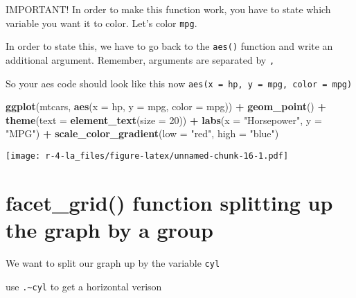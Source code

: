 \documentclass[
]{book}
\newenvironment{Shaded}{\begin{snugshade}}{\end{snugshade}}
\newcommand{\DataTypeTok}[1]{\textcolor[rgb]{0.13,0.29,0.53}{#1}}
\newcommand{\DecValTok}[1]{\textcolor[rgb]{0.00,0.00,0.81}{#1}}
\newcommand{\KeywordTok}[1]{\textcolor[rgb]{0.13,0.29,0.53}{\textbf{#1}}}
\newcommand{\NormalTok}[1]{#1}
\newcommand{\OperatorTok}[1]{\textcolor[rgb]{0.81,0.36,0.00}{\textbf{#1}}}
\newcommand{\StringTok}[1]{\textcolor[rgb]{0.31,0.60,0.02}{#1}}
\begin{document}
IMPORTANT! In order to make this function work, you have to state which variable
you want it to color. Let's color \texttt{mpg}.

In order to state this, we have to go back to the \texttt{aes()} function and write an additional argument. Remember, arguments are separated by \texttt{,}

So your aes code should look like this now \texttt{aes(x\ =\ hp,\ y\ =\ mpg,\ color\ =\ mpg)}

\begin{Shaded}
\begin{Highlighting}[]
\KeywordTok{ggplot}\NormalTok{(mtcars, }\KeywordTok{aes}\NormalTok{(}\DataTypeTok{x =}\NormalTok{ hp, }\DataTypeTok{y =}\NormalTok{ mpg, }\DataTypeTok{color =}\NormalTok{ mpg)) }\OperatorTok{+}\StringTok{ }
\StringTok{ }\KeywordTok{geom\_point}\NormalTok{() }\OperatorTok{+}\StringTok{ }
\StringTok{  }\KeywordTok{theme}\NormalTok{(}\DataTypeTok{text =} \KeywordTok{element\_text}\NormalTok{(}\DataTypeTok{size =} \DecValTok{20}\NormalTok{)) }\OperatorTok{+}
\StringTok{  }\KeywordTok{labs}\NormalTok{(}\DataTypeTok{x =} \StringTok{"Horsepower"}\NormalTok{, }\DataTypeTok{y =} \StringTok{"MPG"}\NormalTok{) }\OperatorTok{+}
\StringTok{  }\KeywordTok{scale\_color\_gradient}\NormalTok{(}\DataTypeTok{low =} \StringTok{"red"}\NormalTok{, }\DataTypeTok{high =} \StringTok{"blue"}\NormalTok{)}
\end{Highlighting}
\end{Shaded}

\texttt{[image: r-4-la\_files/figure-latex/unnamed-chunk-16-1.pdf]}

\hypertarget{facet_grid-function-splitting-up-the-graph-by-a-group}{%
\section{facet\_grid() function splitting up the graph by a group}\label{facet_grid-function-splitting-up-the-graph-by-a-group}}

We want to split our graph up by the variable \texttt{cyl}

use \texttt{.\textasciitilde{}cyl} to get a horizontal verison
\end{document}
